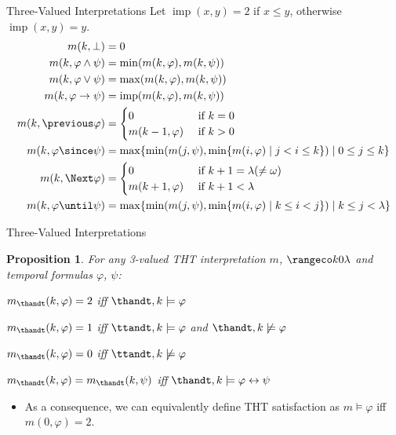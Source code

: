\documentclass[aspectratio=169,xcolor=svgnames]{beamer}
\theoremstyle{theoremstyle_space}
\newtheorem{proposition}{Proposition}
\begin{document}
\begin{frame}{Three-Valued Interpretations}
Let $\operatorname{imp}(x,y)=2$ if $x \leq y$, otherwise
$\operatorname{imp}(x,y)=y$.
\begin{align*}
  m(k, \perp) &= 0 \\
  m(k, \varphi \wedge \psi) &= \min (m(k, \varphi), m(k, \psi)) \\
  m(k, \varphi \vee \psi) &= \max (m(k, \varphi), m(k, \psi)) \\
  m(k, \varphi \rightarrow \psi) &= \operatorname{imp}(m(k, \varphi), m(k, \psi)) \\
  m(k, \previous \varphi) &= \begin{cases}
    0 & \text { if } k=0 \\
    m(k-1, \varphi) & \text { if } k>0
  \end{cases} \\
 m(k, \varphi \since \psi) &= \max \{\min (m(j, \psi), \min \{m(i, \varphi) \mid j<i \leq k\}) \mid 0 \leq j \leq k\} \\
 m(k, \Next \varphi) &= \begin{cases}0 & \text { if } k+1=\lambda(\neq \omega) \\
m(k+1, \varphi) & \text { if } k+1<\lambda\end{cases} \\
 m(k, \varphi \until \psi) &= \max \{\min (m(j, \psi), \min \{m(i, \varphi) \mid k \leq i<j\}) \mid k \leq j<\lambda\} \\
\end{align*}
\end{frame}

\begin{frame}[t]{Three-Valued Interpretations}
\begin{proposition}\label{prop:3-valued-temporal-properties}
  For any 3-valued THT interpretation $m$, $\kinlambda$ and temporal
  formulas $\varphi$, $\psi$:
\begin{description}
\item $m_{\thandt}(k,\varphi) = 2$ iff $\thandt,k \models \varphi$
\item $m_{\thandt}(k,\varphi) = 1$ iff $\ttandt,k \models \varphi$ and $\thandt,k \not\models \varphi$
  \item $m_{\thandt}(k,\varphi) = 0$ iff $\ttandt,k \not\models \varphi$
\item $m_{\thandt}(k,\varphi) = m_{\thandt}(k,\psi)$ iff $\thandt,k \models \varphi \leftrightarrow \psi$
\end{description}
\end{proposition}

\begin{itemize}
\item As a consequence, we can equivalently define THT satisfaction as
  $m \models \varphi$ iff $m(0,\varphi)=2$.
\end{itemize}

\end{frame}
\end{document}
